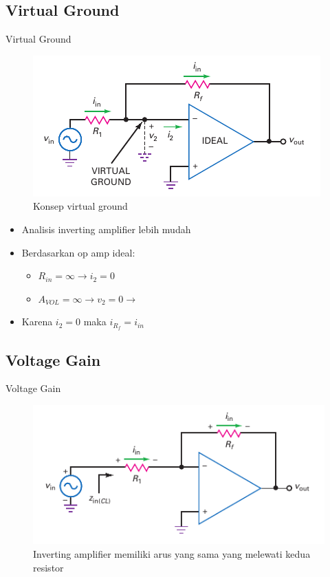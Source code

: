 \subsection{Virtual Ground}
\begin{frame}{Virtual Ground}
	\begin{multicols}{2}
		\begin{figure}
			\centering
			\includegraphics[height=0.4\textheight]{gambar/fig-16.13}
			\caption{Konsep virtual ground}
			\label{fig-16.13}
		\end{figure}
	\columnbreak
		\begin{itemize}
			\item Analisis inverting amplifier lebih mudah
			\item Berdasarkan op amp ideal:
			\begin{itemize}
				\item $ R_{in} = \infty \rightarrow i_2 = 0$
				\item $ A_{VOL} = \infty \rightarrow v_2 = 0 \rightarrow $
			\end{itemize}
			\item Karena $ i_2 = 0 $ maka $ i_{R_f} = i_{in} $
		\end{itemize}
	\end{multicols}
\end{frame}

\subsection{Voltage Gain}
\begin{frame}{Voltage Gain}
	\begin{figure}
		\centering
		\includegraphics[height=0.5\textheight]{gambar/fig-16.14}
		\caption{Inverting amplifier memiliki arus yang sama yang melewati kedua resistor}
		\label{fig-16.14}
	\end{figure}
\end{frame}

